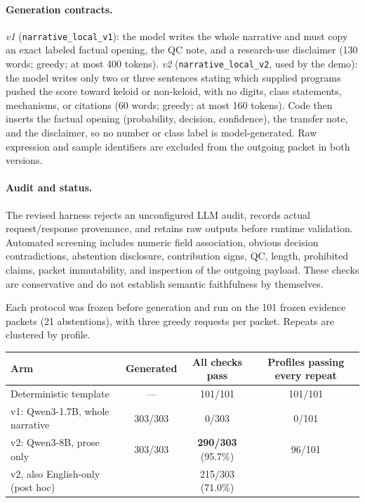 \paragraph{Generation contracts.} \emph{v1} (\texttt{narrative\_local\_v1}):
the model writes the whole narrative and must copy an exact labeled factual
opening, the QC note, and a research-use disclaimer (130 words; greedy; at most
400 tokens). \emph{v2} (\texttt{narrative\_local\_v2}, used by the demo): the
model writes only two or three sentences stating which supplied programs pushed
the score toward keloid or non-keloid, with no digits, class statements,
mechanisms, or citations (60 words; greedy; at most 160 tokens). Code then
inserts the factual opening (probability, decision, confidence), the transfer
note, and the disclaimer, so no number or class label is model-generated. Raw
expression and sample identifiers are excluded from the outgoing packet in
both versions.

\paragraph{Audit and status.} The revised harness rejects an unconfigured
LLM audit, records actual request/response provenance, and retains raw outputs
before runtime validation. Automated screening includes numeric field
association, obvious decision contradictions, abstention disclosure,
contribution signs, QC, length, prohibited claims, packet immutability, and
inspection of the outgoing payload. These checks are conservative and do not
establish semantic faithfulness by themselves.

Each protocol was frozen before generation and run on the 101 frozen evidence
packets (21 abstentions), with three greedy requests per packet. Repeats are
clustered by profile.

{\small
\begin{tabular}{@{}lccc@{}}
\toprule
Arm & Generated & All checks pass & Profiles passing every repeat \\
\midrule
Deterministic template & --- & 101/101 & 101/101 \\
v1: Qwen3-1.7B, whole narrative & 303/303 & 0/303 & 0/101 \\
v2: Qwen3-8B, prose only & 303/303 & \textbf{290/303} (95.7\%) & 96/101 \\
\quad v2, also English-only (post hoc) & & 215/303 (71.0\%) & \\
\bottomrule
\end{tabular}
}

